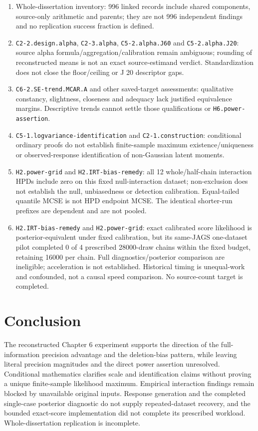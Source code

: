 \documentclass[11pt]{article}
\begin{document}
\begin{enumerate}
\item\label{lim:8} Whole-dissertation inventory: 996 linked records include shared components, source-only arithmetic and parents; they are not 996 independent findings and no replication success fraction is defined.
\item\label{lim:9} \nolinkurl{C2-2.design.alpha}, \nolinkurl{C2-3.alpha}, \nolinkurl{C5-2.alpha.J60} and \nolinkurl{C5-2.alpha.J20}: source alpha formula/aggregation/calibration remain ambiguous; rounding of reconstructed means is not an exact source-estimand verdict. Standardization does not close the floor/ceiling or J 20 descriptor gaps.
\item\label{lim:10} \nolinkurl{C6-2.SE-trend.MCAR.A} and other saved-target assessments: qualitative constancy, slightness, closeness and adequacy lack justified equivalence margins. Descriptive trends cannot settle those qualifications or \nolinkurl{H6.power-assertion}.
\item\label{lim:11} \nolinkurl{C5-1.logvariance-identification} and \nolinkurl{C2-1.construction}: conditional ordinary proofs do not establish finite-sample maximum existence/uniqueness or observed-response identification of non-Gaussian latent moments.
\item\label{lim:12} \nolinkurl{H2.power-grid} and \nolinkurl{H2.IRT-bias-remedy}: all 12 whole/half-chain interaction HPDs include zero on this fixed null-interaction dataset; non-exclusion does not establish the null, unbiasedness or detection calibration. Equal-tailed quantile MCSE is not HPD endpoint MCSE. The identical shorter-run prefixes are dependent and are not pooled.
\item\label{lim:13} \nolinkurl{H2.IRT-bias-remedy} and \nolinkurl{H2.power-grid}: exact calibrated score likelihood is posterior-equivalent under fixed calibration, but its same-JAGS one-dataset pilot completed 0 of 4 prescribed 28000-draw chains within the fixed budget, retaining 16000 per chain. Full diagnostics/posterior comparison are ineligible; acceleration is not established. Historical timing is unequal-work and confounded, not a causal speed comparison. No source-count target is completed.
\end{enumerate}
\section{Conclusion}\label{sec:conclusion}
The reconstructed Chapter 6 experiment supports the direction of the full-information precision advantage and the deletion-bias pattern, while leaving literal precision magnitudes and the direct power assertion unresolved. Conditional mathematics clarifies scale and identification claims without proving a unique finite-sample likelihood maximum. Empirical interaction findings remain blocked by unavailable original inputs. Response generation and the completed single-case posterior diagnostic do not supply repeated-dataset recovery, and the bounded exact-score implementation did not complete its prescribed workload. Whole-dissertation replication is incomplete.
\end{document}
